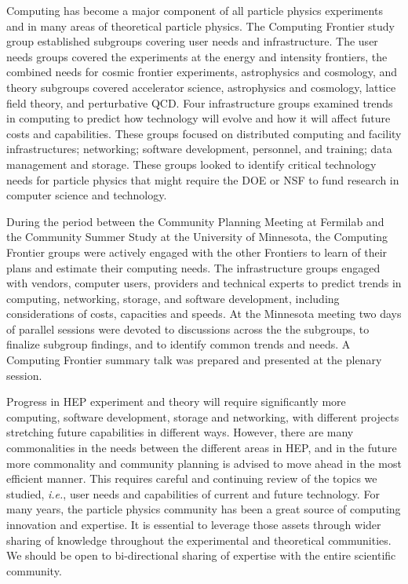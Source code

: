 Computing has become a major component of all particle physics experiments
and in many areas of theoretical particle physics. The Computing Frontier
study group established subgroups covering user needs and infrastructure.
The user needs groups covered the experiments at the energy and intensity
frontiers, the combined needs for cosmic frontier experiments, astrophysics
and cosmology, and theory subgroups covered accelerator science,
astrophysics and cosmology, lattice field theory, and perturbative QCD.
Four infrastructure groups examined trends in computing to predict how
technology will evolve and how it will affect future costs and
capabilities. These groups focused on distributed computing and facility
infrastructures; networking; software development, personnel, and training;
data management and storage. These groups looked to identify critical
technology needs for particle physics that might require the DOE or NSF to
fund research in computer science and technology.

During the period between the Community Planning Meeting at Fermilab and
the Community Summer Study at the University of Minnesota, the Computing
Frontier groups were actively engaged with the other Frontiers to learn of
their plans and estimate their computing needs. The infrastructure groups
engaged with vendors, computer users, providers and technical experts to
predict trends in computing, networking, storage, and software development,
including considerations of costs, capacities and speeds. At the Minnesota
meeting two days of parallel sessions were devoted to discussions across
the the subgroups, to finalize subgroup findings, and to identify common
trends and needs. A Computing Frontier summary talk was prepared and
presented at the plenary session.

Progress in HEP experiment and theory will require significantly more
computing, software development, storage and networking, with different
projects stretching future capabilities in different ways. However, there
are many commonalities in the needs between the different areas in HEP, and
in the future more commonality and community planning is advised to move
ahead in the most efficient manner. This requires careful and continuing
review of the topics we studied, {\it i.e.}, user needs and capabilities of
current and future technology. For many years, the particle physics
community has been a great source of computing innovation and expertise. It
is essential to leverage those assets through wider sharing of knowledge
throughout the experimental and theoretical communities. 
We should be open to bi-directional sharing of expertise with the entire
scientific community.

